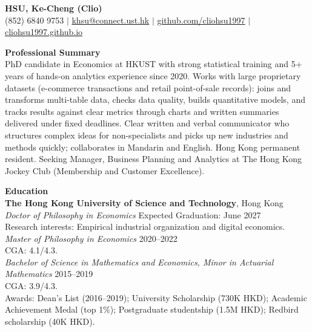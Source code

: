 \documentclass[11pt,letterpaper]{article}
\begin{document}
{\Large \textbf{HSU, Ke-Cheng (Clio)}}\\[1pt]
(852) 6840 9753 \quad $|$ \quad \href{mailto:khsu@connect.ust.hk}{khsu@connect.ust.hk} \quad $|$ \quad \href{https://github.com/cliohsu1997}{github.com/cliohsu1997} \quad $|$ \quad \href{https://cliohsu1997.github.io/}{cliohsu1997.github.io}

\vspace{0.15pt}

{\large \textbf{Professional Summary}}\\[-0.5pt]
PhD candidate in Economics at HKUST with strong statistical training and 5+ years of hands-on analytics experience since 2020. Works with large proprietary datasets (e-commerce transactions and retail point-of-sale records): joins and transforms multi-table data, checks data quality, builds quantitative models, and tracks results against clear metrics through charts and written summaries delivered under fixed deadlines. Clear written and verbal communicator who structures complex ideas for non-specialists and picks up new industries and methods quickly; collaborates in Mandarin and English. Hong Kong permanent resident. Seeking Manager, Business Planning and Analytics at The Hong Kong Jockey Club (Membership and Customer Excellence).

\vspace{0.15pt}

{\large \textbf{Education}}\\[-0.5pt]
\textbf{The Hong Kong University of Science and Technology}, Hong Kong\\
\textit{Doctor of Philosophy in Economics} \hfill Expected Graduation: June 2027\\
Research interests: Empirical industrial organization and digital economics.\\
\textit{Master of Philosophy in Economics} \hfill 2020--2022\\
CGA: 4.1/4.3.\\
\textit{Bachelor of Science in Mathematics and Economics, Minor in Actuarial Mathematics} \hfill 2015--2019\\
CGA: 3.9/4.3.\\
Awards: Dean's List (2016--2019); University Scholarship (730K HKD); Academic Achievement Medal (top 1\%); Postgraduate studentship (1.5M HKD); Redbird scholarship (40K HKD).

\vspace{0.15pt}
\end{document}
